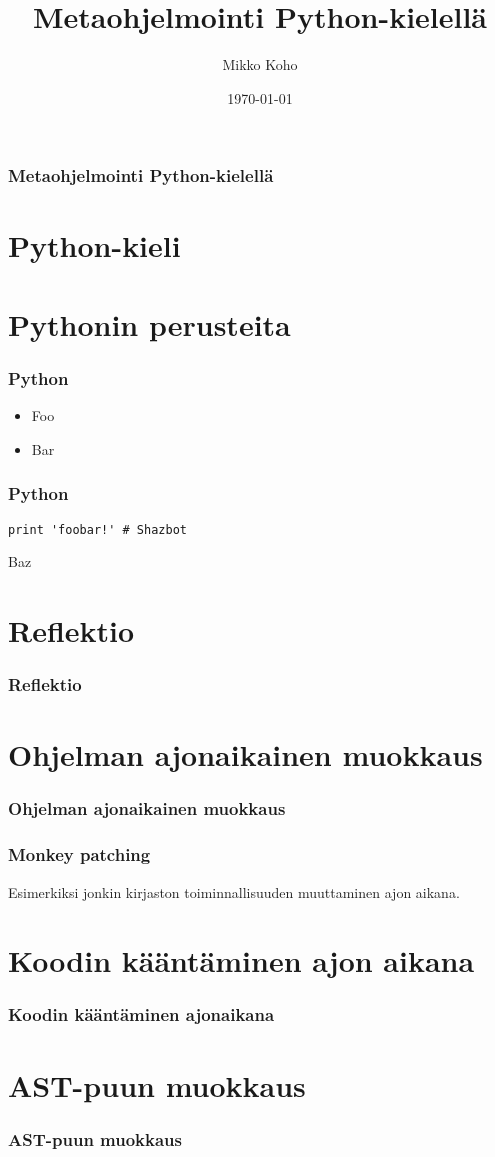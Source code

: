 \documentclass{beamer}
\title{Metaohjelmointi Python-kielellä}
\author{Mikko Koho}
\institute{Institute of Computer Science\\Helsingin Yliopisto}
\date{\today}
\begin{document}
\frame{\titlepage}


\begin{frame}
  \frametitle{Metaohjelmointi Python-kielellä}
  \tableofcontents%
\end{frame}

\section{Python-kieli}

\section{Pythonin perusteita}
\begin{frame}[fragile]
\frametitle{Python}
\begin{itemize}
\item{Foo}
\item{Bar}
\end{itemize}
\end{frame}


\begin{frame}[fragile]
\frametitle{Python}
\begin{verbatim}
print 'foobar!' # Shazbot
\end{verbatim}

Baz
\end{frame}

\section{Reflektio}

\begin{frame}[fragile]
\frametitle{Reflektio}
\end{frame}

\section{Ohjelman ajonaikainen muokkaus}

\begin{frame}[fragile]
\frametitle{Ohjelman ajonaikainen muokkaus}
\end{frame}

\begin{frame}[fragile]
\frametitle{Monkey patching}
Esimerkiksi jonkin kirjaston toiminnallisuuden muuttaminen ajon aikana. 
\end{frame}

\section{Koodin kääntäminen ajon aikana}

\begin{frame}[fragile]
\frametitle{Koodin kääntäminen ajonaikana}
\end{frame}

\section{AST-puun muokkaus}

\begin{frame}[fragile]
\frametitle{AST-puun muokkaus}
\end{frame}
\end{document}
